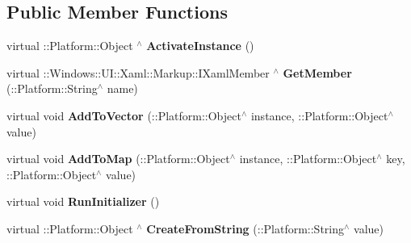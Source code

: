 \subsection*{Public Member Functions}
\begin{DoxyCompactItemize}
\item 
\mbox{\label{class_xaml_type_info_1_1_info_provider_1_1_xaml_system_base_type_a7bc524ad414b526f74f4b1430950b43c}} 
virtual \+::Platform\+::\+Object $^\wedge$ {\bfseries Activate\+Instance} ()
\item 
\mbox{\label{class_xaml_type_info_1_1_info_provider_1_1_xaml_system_base_type_a1897c34762f46b0b6ba1896dfe22b742}} 
virtual \+::Windows\+::\+U\+I\+::\+Xaml\+::\+Markup\+::\+I\+Xaml\+Member $^\wedge$ {\bfseries Get\+Member} (\+::Platform\+::\+String$^\wedge$ name)
\item 
\mbox{\label{class_xaml_type_info_1_1_info_provider_1_1_xaml_system_base_type_aaafca3b7939450d02d74df7fa930c623}} 
virtual void {\bfseries Add\+To\+Vector} (\+::Platform\+::\+Object$^\wedge$ instance, \+::Platform\+::\+Object$^\wedge$ value)
\item 
\mbox{\label{class_xaml_type_info_1_1_info_provider_1_1_xaml_system_base_type_a96244e1a7ed8813253abac0b606a68c6}} 
virtual void {\bfseries Add\+To\+Map} (\+::Platform\+::\+Object$^\wedge$ instance, \+::Platform\+::\+Object$^\wedge$ key, \+::Platform\+::\+Object$^\wedge$ value)
\item 
\mbox{\label{class_xaml_type_info_1_1_info_provider_1_1_xaml_system_base_type_a622f1311cdaa7761b778a59e931c7420}} 
virtual void {\bfseries Run\+Initializer} ()
\item 
\mbox{\label{class_xaml_type_info_1_1_info_provider_1_1_xaml_system_base_type_a555d48692a6fd5e40fbe554c28b43dc2}} 
virtual \+::Platform\+::\+Object $^\wedge$ {\bfseries Create\+From\+String} (\+::Platform\+::\+String$^\wedge$ value)
\item 

\end{DoxyCompactItemize}
